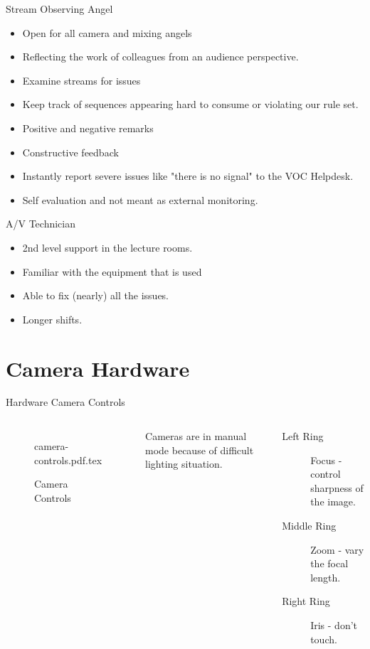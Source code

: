 \documentclass[aspectratio=169]{beamer}
\begin{document}
\begin{frame}{Stream Observing Angel}
	\begin{itemize}
		\item Open for all camera and mixing angels
		\item Reflecting the work of colleagues from an audience perspective.
		\item Examine streams for issues 
		\item Keep track of sequences appearing hard to consume or violating our rule set. 
		\item Positive and negative remarks 
		\item Constructive feedback 
		\item Instantly report severe issues like "there is no signal" to the VOC Helpdesk.
		\item Self evaluation and not meant as external monitoring. 
	\end{itemize}
\end{frame}

\begin{frame}{A/V Technician}
	\begin{itemize}
		\item 2nd level support in the lecture rooms. 
		\item Familiar with the equipment that is used 
		\item Able to fix (nearly) all the issues. 
		\item Longer shifts.
	\end{itemize}
\end{frame}

\section{Camera Hardware}
\begin{frame}{Hardware Camera Controls}
	\begin{columns}[T,onlytextwidth]
	\begin{figure} 
		\centering
		\def\svgwidth{0.9\textwidth}
		{camera-controls.pdf.tex}
		\caption{Camera Controls}
		\label{fig:cc1}
	\end{figure}
	Cameras are in manual mode because of difficult lighting situation.
	\begin{description}
		\item[Left Ring] Focus - control sharpness of the image.
		\item[Middle Ring] Zoom - vary the focal length.
		\item[Right Ring] Iris - don't touch.
     \end{description}
\end{columns}
\end{frame}
\end{document}
